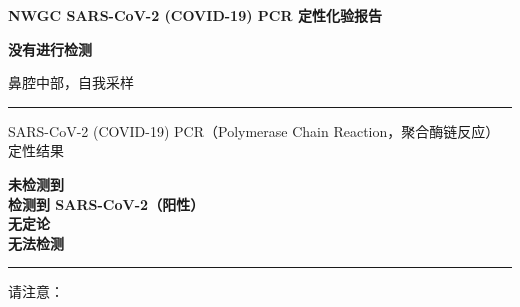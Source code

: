 \documentclass[10pt]{article}
\newcommand{\PageLine}{\rule{\textwidth}{0.25mm}}
\begin{document}
\begin{center}
\Large
\textbf{NWGC SARS-CoV-2 (COVID-19) PCR 定性化验报告}
\end{center}

\bigskip

\begin{description}[font=\normalfont,align=left,labelwidth=8em]
\item [参与者姓名] \textbf{}
\item [出生日期] \textbf{}
\item [样本标识符] \textbf{}
\item [样本提交日期] \textbf{}
\item [结果提供日期]
  \textbf{没有进行检测}
  \textbf{}
\item [样本类型] 鼻腔中部，自我采样
\end{description}

\PageLine

SARS-CoV-2 (COVID-19) PCR（Polymerase Chain Reaction，聚合酶链反应）定性结果

\textbf{未检测到}\\
\textbf{检测到 SARS-CoV-2（阳性）}\\
\textbf{无定论}\\
\textbf{无法检测}\\

\PageLine

请注意：
\end{document}
